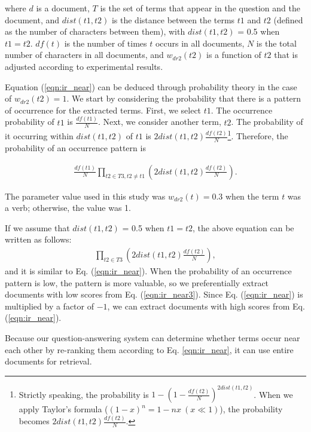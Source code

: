 \begin{enumerate}
\noindent 
where $d$ is a document, $T$ is the set of terms that appear in the question and the document, and 
$dist(t1,t2)$ is the distance between 
the terms $t1$ and $t2$ (defined as the number of characters between them), with $dist(t1,t2)$ = 
0.5 when $t1 = t2$. $df(t)$ is the number of times $t$ occurs in all documents, $N$ is 
the total number of characters in all documents, and $w_{dr2}(t2)$ is a function of 
$t2$ that is adjusted according to experimental results.  

Equation (\ref{eqn:ir_near}) can be deduced through probability theory 
in the case of $w_{dr2}(t2)=1$. 
We start by considering the probability that there is a pattern of occurrence for the extracted terms. 
First, we select $t1$. The occurrence probability of $t1$ is $\frac{df(t1)}{N}$. 
Next, we consider another term, $t2$. The probability of it occurring 
within $dist(t1,t2)$ of $t1$ is 
$2dist(t1,t2)\frac{df(t2)}{N}$\footnote{Strictly speaking, 
the probability is $1 - (1 - \frac{df(t2)}{N})^{2dist(t1,t2)}$. 
When we apply Taylor's formula ($(1 - x)^n = 1 - nx \ (x \ll 1)$), 
the probability becomes $2dist(t1,t2)\frac{df(t2)}{N}$.}. 
Therefore, the probability of an occurrence pattern is 

{
\begin{eqnarray}
\label{eqn:ir_near3}
\displaystyle \frac{df(t1)}{N} \prod_{t2 \in T3, t2 \neq t1} 
(2dist(t1,t2)\frac{df(t2)}{N}).
\end{eqnarray}}

The parameter value used in this study was $w_{dr2}(t) = 0.3$ 
when the term $t$ was a verb; otherwise, the value was 1. 

If we assume that $dist(t1,t2)$ = 0.5 when $t1 = t2$, the above equation can be written as follows:
{
\begin{eqnarray}
\label{eqn:ir_near3_add}
\displaystyle \prod_{t2 \in T3} 
(2dist(t1,t2)\frac{df(t2)}{N}),
\end{eqnarray}}
and it is similar to Eq. (\ref{eqn:ir_near}). When the probability of an occurrence pattern is 
low, 
the pattern is more valuable, so we preferentially extract documents with low scores from Eq. 
(\ref{eqn:ir_near3}). Since Eq. (\ref{eqn:ir_near}) is multiplied by a factor of $-1$, we 
can extract 
documents with high scores from Eq. (\ref{eqn:ir_near}). 

\end{enumerate}

Because our question-answering system can determine whether 
terms occur near each other by re-ranking them according to Eq. \ref{eqn:ir_near}, 
it can use entire documents for retrieval. 

